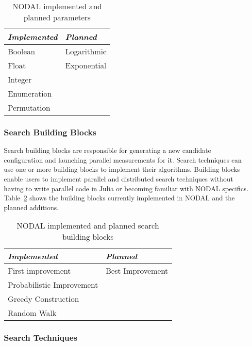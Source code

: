 \begin{table}[htpb]
\centering
\begin{tabular}{@{}p{}p{}@{}}
\toprule
\textit{Implemented} & \textit{Planned} \\ \midrule
Boolean & Logarithmic \\
Float & Exponential \\
Integer & \\
Enumeration & \\
Permutation & \\ \bottomrule
\end{tabular}
\caption{NODAL implemented and planned parameters}
\label{tab:nodal-parameters}
\end{table}

\subsubsection{Search Building Blocks}

Search building blocks are responsible for generating a new candidate
configuration and launching parallel measurements for it. Search techniques can
use one or more building blocks to implement their algorithms. Building blocks
enable users to implement parallel and distributed search techniques without
having to write parallel code in Julia or becoming familiar with NODAL
specifics. Table~\ref{tab:nodal-blocks} shows the building blocks currently
implemented in NODAL and the planned additions.

\begin{table}[htpb]
\centering
\begin{tabular}{@{}p{}p{}@{}}
\toprule
\textit{Implemented} & \textit{Planned} \\ \midrule
First improvement & Best Improvement \\
Probabilistic Improvement & \\
Greedy Construction & \\
Random Walk & \\ \bottomrule
\end{tabular}
\caption{NODAL implemented and planned search building blocks}
\label{tab:nodal-blocks}
\end{table}

\subsubsection{Search Techniques}


